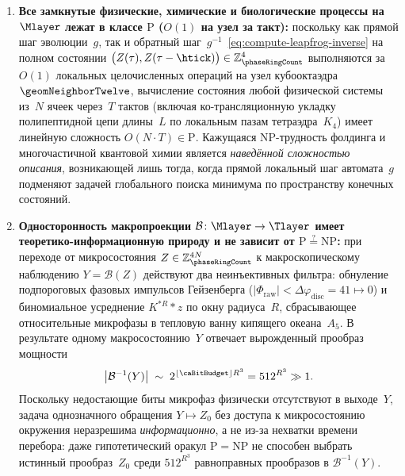 \begin{theorem}[Естественная динамика в $\mathrm{P}$ и независимость односторонности $\mathcal{B}$ от $\mathrm{P}\stackrel{?}{=}\mathrm{NP}$]
\label{thm:compute-p-np-separation}
\begin{enumerate}[leftmargin=*]
\item \textbf{Все замкнутые физические, химические и биологические процессы на~$\Mlayer$ лежат в классе $\mathrm{P}$ ($O(1)$ на узел за такт):}
  поскольку как прямой шаг эволюции~$g$, так и обратный шаг~$g^{-1}$~\eqref{eq:compute-leapfrog-inverse} на полном состоянии $\bigl(Z(\tau), Z(\tau-\htick)\bigr) \in \mathbb{Z}_{\phaseRingCount}^4$ выполняются за $O(1)$ локальных целочисленных операций на узел кубооктаэдра~$\geomNeighborTwelve$, вычисление состояния любой физической системы из~$N$ ячеек через~$T$ тактов (включая ко-трансляционную укладку полипептидной цепи длины~$L$ по локальным пазам тетраэдра~$K_4$) имеет линейную сложность $O(N\cdot T) \in \mathrm{P}$.
  Кажущаяся $\mathrm{NP}$-трудность фолдинга и многочастичной квантовой химии является \emph{наведённой сложностью описания}, возникающей лишь тогда, когда прямой локальный шаг автомата~$g$ подменяют задачей глобального поиска минимума по пространству конечных состояний.
\item \textbf{Односторонность макропроекции $\mathcal{B}\colon \Mlayer \to \Tlayer$ имеет теоретико-информационную природу и не зависит от $\mathrm{P}\stackrel{?}{=}\mathrm{NP}$:}
  при переходе от микросостояния $Z \in \mathbb{Z}_{\phaseRingCount}^{4 N}$ к макроскопическому наблюдению $Y = \mathcal{B}(Z)$ действуют два неинъективных фильтра:
  обнуление подпороговых фазовых импульсов Гейзенберга ($|\Phi_{\mathrm{raw}}| < \Delta\varphi_{\mathrm{disc}} = 41 \mapsto 0$) и биномиальное усреднение $K^{*R} * z$ по окну радиуса~$R$, сбрасывающее относительные микрофазы в тепловую ванну кипящего океана~$A_5$.
  В результате одному макросостоянию~$Y$ отвечает вырожденный прообраз мощности
  \begin{equation}
  \label{eq:compute-kernel-degeneracy}
    \bigl|\mathcal{B}^{-1}(Y)\bigr| \;\sim\; 2^{\lfloor\caBitBudget\rfloor R^3} = 512^{R^3} \gg 1.
  \end{equation}
  Поскольку недостающие биты микрофаз физически отсутствуют в выходе~$Y$, задача однозначного обращения $Y \mapsto Z_0$ без доступа к микросостоянию окружения неразрешима \emph{информационно}, а не из-за нехватки времени перебора: даже гипотетический оракул $\mathrm{P}=\mathrm{NP}$ не способен выбрать истинный прообраз~$Z_0$ среди $512^{R^3}$ равноправных прообразов в $\mathcal{B}^{-1}(Y)$.
\end{enumerate}
\end{theorem}

